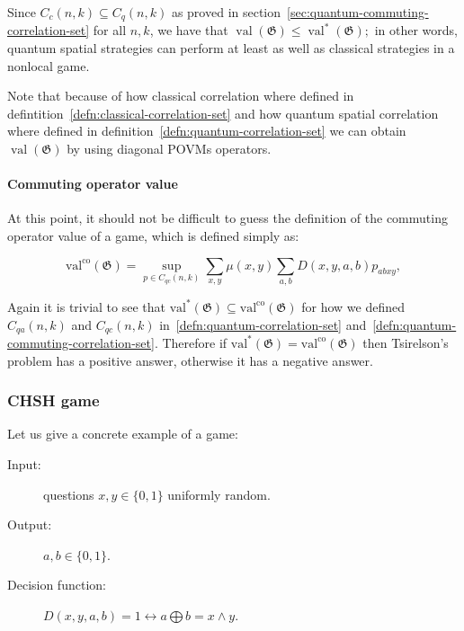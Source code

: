 Since $C_{c}(n, k) \subseteq C_{q}(n, k)$ as proved in section~\ref{sec:quantum-commuting-correlation-set} for all $n, k$, we have that $\operatorname{val}(\mathfrak{G}) \leq \operatorname{val}^{*}(\mathfrak{G}) ;$ in other words, quantum spatial strategies can perform at least as well as classical strategies in a nonlocal game.

Note that because of how classical correlation where defined in defintition~\ref{defn:classical-correlation-set} and how quantum spatial correlation where defined in definition~\ref{defn:quantum-correlation-set} we can obtain $\operatorname{val}(\mathfrak{G})$ by using diagonal POVMs operators.  

\paragraph{Commuting operator value}

At this point, it should not be difficult to guess the definition of the commuting operator value of a game, which is defined simply as:

\begin{defn}
    \begin{equation}
    \operatorname{val^\text{co}}(\mathfrak{G})=\sup _{p \in C_{q c}(n, k)} \sum_{x, y} \mu(x, y) \sum_{a, b} D(x, y, a, b) p_{a b x y},
    \end{equation}
\end{defn}

Again it is trivial to see that $\operatorname{val^{*}}(\mathfrak{G}) \subseteq \operatorname{val^\text{co}}(\mathfrak{G})$ for how we defined $C_{q a}(n, k)$ and $C_{q c}(n, k)$ in~\ref{defn:quantum-correlation-set} and~\ref{defn:quantum-commuting-correlation-set}.
Therefore if $\operatorname{val^{*}}(\mathfrak{G}) = \operatorname{val^\text{co}}(\mathfrak{G})$ then Tsirelson's problem has a positive answer, otherwise it has a negative answer.


\subsubsection{CHSH game}

Let us give a concrete example of a game:
\begin{description}
\item[Input:]questions $x,y \in \{0,1\}$ uniformly random.
\item[Output:]$a,b \in \{0,1\}$.
\item[Decision function: ]$D(x, y, a, b) = 1 \leftrightarrow a \bigoplus b = x \land y $. 
\end{description}

